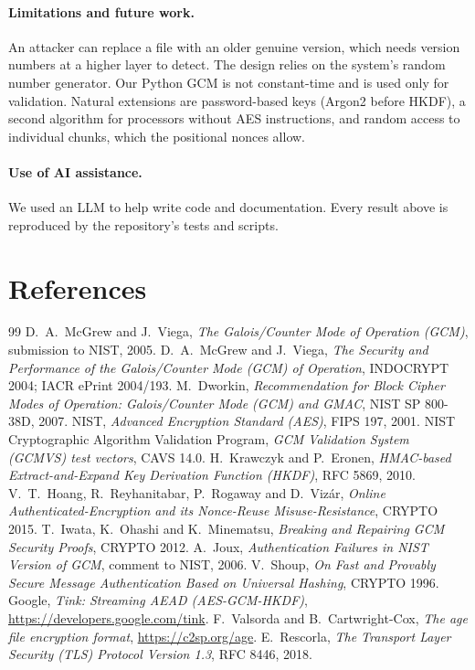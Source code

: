 \documentclass[11pt,a4paper]{article}
\begin{document}
\paragraph{Limitations and future work.} An attacker can replace a file with an older genuine version, which needs version numbers at a higher layer to detect. The design relies on the system's random number generator. Our Python GCM is not constant-time and is used only for validation. Natural extensions are password-based keys (Argon2 before HKDF), a second algorithm for processors without AES instructions, and random access to individual chunks, which the positional nonces allow.

\paragraph{Use of AI assistance.} We used an LLM to help write code and documentation. Every result above is reproduced by the repository's tests and scripts.

\section{References}
\begingroup
\renewcommand{\section}[2]{}
\begin{thebibliography}{99}
 D.~A.~McGrew and J.~Viega, \emph{The Galois/Counter Mode of Operation (GCM)}, submission to NIST, 2005.
 D.~A.~McGrew and J.~Viega, \emph{The Security and Performance of the Galois/Counter Mode (GCM) of Operation}, INDOCRYPT 2004; IACR ePrint 2004/193.
 M.~Dworkin, \emph{Recommendation for Block Cipher Modes of Operation: Galois/Counter Mode (GCM) and GMAC}, NIST SP 800-38D, 2007.
 NIST, \emph{Advanced Encryption Standard (AES)}, FIPS 197, 2001.
 NIST Cryptographic Algorithm Validation Program, \emph{GCM Validation System (GCMVS) test vectors}, CAVS 14.0.
 H.~Krawczyk and P.~Eronen, \emph{HMAC-based Extract-and-Expand Key Derivation Function (HKDF)}, RFC 5869, 2010.
 V.~T.~Hoang, R.~Reyhanitabar, P.~Rogaway and D.~Viz\'ar, \emph{Online Authenticated-Encryption and its Nonce-Reuse Misuse-Resistance}, CRYPTO 2015.
 T.~Iwata, K.~Ohashi and K.~Minematsu, \emph{Breaking and Repairing GCM Security Proofs}, CRYPTO 2012.
 A.~Joux, \emph{Authentication Failures in NIST Version of GCM}, comment to NIST, 2006.
 V.~Shoup, \emph{On Fast and Provably Secure Message Authentication Based on Universal Hashing}, CRYPTO 1996.
 Google, \emph{Tink: Streaming AEAD (AES-GCM-HKDF)}, \url{https://developers.google.com/tink}.
 F.~Valsorda and B.~Cartwright-Cox, \emph{The age file encryption format}, \url{https://c2sp.org/age}.
 E.~Rescorla, \emph{The Transport Layer Security (TLS) Protocol Version 1.3}, RFC 8446, 2018.
\end{thebibliography}
\endgroup
\end{document}
